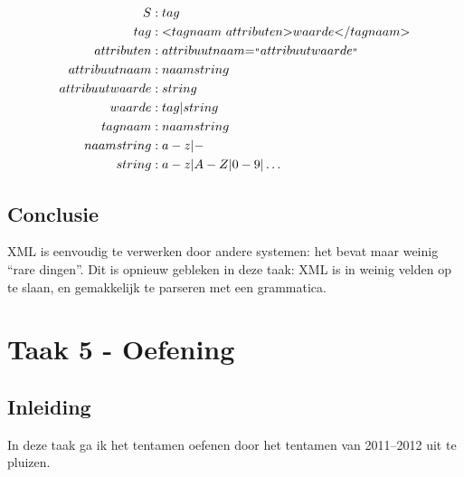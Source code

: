 \documentclass[10pt]{article}
\begin{document}
\begin{align*}
S               & : tag                                                                                                           \\ 
tag             & : \text{\textless} tagnaam\  attributen \text{\textgreater} waarde \text{\textless/}tagnaam \text{\textgreater} \\ 
attributen      & : attribuutnaam \text{=}^\text{\textquotestraightdblbase} attribuutwaarde ^\text{\textquotestraightdblbase}     \\ 
attribuutnaam   & : naamstring                                                                                                    \\ 
attribuutwaarde & : string                                                                                                        \\ 
waarde          & : tag | string                                                                                                  \\ 
tagnaam         & : naamstring                                                                                                    \\ 
naamstring      & : a-z | -                                                                                                       \\ 
string          & : a-z | A-Z | 0-9 | \dots                                                                                       \\ 
\end{align*}

\subsection{Conclusie}

XML is eenvoudig te verwerken door andere systemen: het bevat maar weinig
``rare dingen''. Dit is opnieuw gebleken in deze taak: XML is in weinig velden
op te slaan, en gemakkelijk te parseren met een grammatica. 

\section{Taak 5 - Oefening}

\subsection{Inleiding}
In deze taak ga ik het tentamen oefenen door het tentamen van 2011--2012\cite{tentamen2011} uit te 
pluizen. 
\end{document}
